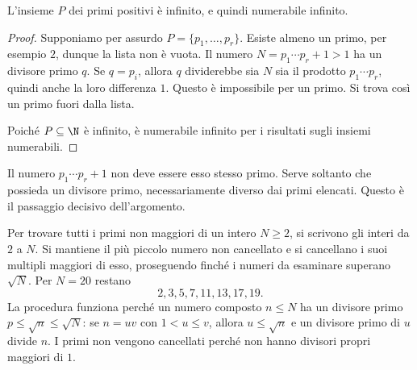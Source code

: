 \begin{teorema}
L'insieme $P$ dei primi positivi è infinito, e quindi numerabile infinito.
\end{teorema}
\begin{proof}
Supponiamo per assurdo $P=\{p_1,\ldots,p_r\}$. Esiste almeno un primo, per esempio $2$, dunque la lista non è vuota. Il numero $N=p_1\cdots p_r+1>1$ ha un divisore primo $q$. Se $q=p_i$, allora $q$ dividerebbe sia $N$ sia il prodotto $p_1\cdots p_r$, quindi anche la loro differenza $1$. Questo è impossibile per un primo. Si trova così un primo fuori dalla lista.

Poiché $P\subseteq\N$ è infinito, è numerabile infinito per i risultati sugli insiemi numerabili.
\end{proof}

\begin{osservazione}
Il numero $p_1\cdots p_r+1$ non deve essere esso stesso primo. Serve soltanto che possieda un divisore primo, necessariamente diverso dai primi elencati. Questo è il passaggio decisivo dell'argomento.
\end{osservazione}

\begin{esempio}
Per trovare tutti i primi non maggiori di un intero $N\ge2$, si scrivono gli interi da $2$ a $N$. Si mantiene il più piccolo numero non cancellato e si cancellano i suoi multipli maggiori di esso, proseguendo finché i numeri da esaminare superano $\sqrt N$. Per $N=20$ restano
\[
2,3,5,7,11,13,17,19.
\]
La procedura funziona perché un numero composto $n\le N$ ha un divisore primo $p\le\sqrt n\le\sqrt N$: se $n=uv$ con $1<u\le v$, allora $u\le\sqrt n$ e un divisore primo di $u$ divide $n$. I primi non vengono cancellati perché non hanno divisori propri maggiori di $1$.
\end{esempio}

